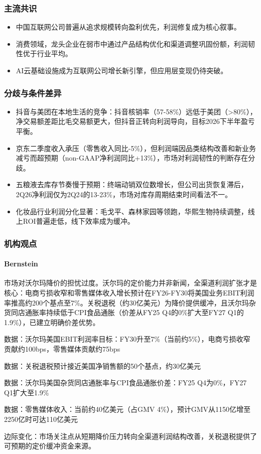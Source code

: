 \documentclass[11pt]{ctexart}
\begin{document}
\subsubsection*{主流共识}
\begin{itemize}
  \item 中国互联网公司普遍从追求规模转向盈利优先，利润修复成为核心叙事。
  \item 消费领域，龙头企业在弱市中通过产品结构优化和渠道调整巩固份额，利润韧性优于行业平均。
  \item AI云基础设施成为互联网公司增长新引擎，但应用层变现仍待突破。
\end{itemize}
\subsubsection*{分歧与条件差异}
\begin{itemize}
  \item 抖音与美团在本地生活的竞争：抖音核销率（57-58\%）远低于美团（>80\%），净交易额差距比毛交易额更大，但抖音正转向利润导向，目标2026下半年盈亏平衡。
  \item 京东二季度收入承压（零售收入同比-5\%），但利润端因品类结构改善和新业务减亏而超预期（non-GAAP净利润同比+13\%），市场对利润韧性的判断存在分歧。
  \item 五粮液去库存节奏慢于预期：终端动销双位数增长，但公司出货恢复滞后，2Q26净利润仅为2Q24的13-23\%，市场对库存周期结束时间看法不一。
  \item 化妆品行业利润分化显著：毛戈平、森林家园等领跑，华熙生物持续调整，线上ROI普遍走低，线下效率成为缓冲。
\end{itemize}
\subsubsection*{机构观点}
\paragraph{Bernstein} 市场对沃尔玛降价的担忧过度。沃尔玛的定价能力并非新闻，全渠道利润扩张才是核心：电商亏损收窄和零售媒体收入增长预计在FY26-FY30将美国业务EBIT利润率推高约200个基点至7\%。关税退税（约30亿美元）为降价提供缓冲，且沃尔玛杂货同店通胀率持续低于CPI食品通胀（价差从FY25 Q4的0\%扩大至FY27 Q1的1.9\%），已建立明确价差优势。
{\small\color{refgray}数据：沃尔玛美国EBIT利润率目标：FY30升至7\%（当前约5\%），电商亏损收窄贡献约100bps，零售媒体贡献约75bps\par}
{\small\color{refgray}数据：关税退税预计接近美国净销售额的50个基点，约30亿美元\par}
{\small\color{refgray}数据：沃尔玛美国杂货同店通胀率与CPI食品通胀价差：FY25 Q4为0\%，FY27 Q1扩大至1.9\%\par}
{\small\color{refgray}数据：零售媒体收入：当前约40亿美元（占GMV 4\%），预计GMV从1150亿增至2250亿时可达110亿美元\par}
{\small\color{refgray}边际变化：市场关注点从短期降价压力转向全渠道利润结构改善，关税退税提供了可预期的定价缓冲资金来源。\par}
\end{document}
